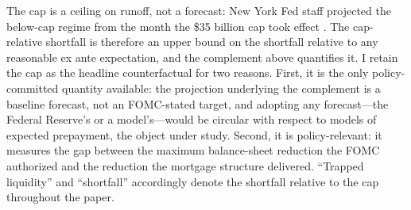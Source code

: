 The cap is a ceiling on runoff, not a forecast: New York Fed staff projected the below-cap regime from the month the \$35 billion cap took effect \citep{nyfed2022}. The cap-relative shortfall is therefore an upper bound on the shortfall relative to any reasonable ex ante expectation, and the complement above quantifies it. I retain the cap as the headline counterfactual for two reasons. First, it is the only policy-committed quantity available: the projection underlying the complement is a baseline forecast, not an FOMC-stated target, and adopting any forecast---the Federal Reserve's or a model's---would be circular with respect to models of expected prepayment, the object under study. Second, it is policy-relevant: it measures the gap between the maximum balance-sheet reduction the FOMC authorized and the reduction the mortgage structure delivered. ``Trapped liquidity'' and ``shortfall'' accordingly denote the shortfall relative to the cap throughout the paper.
